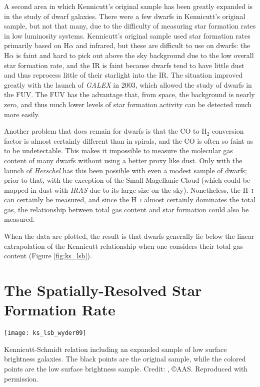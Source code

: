 A second area in which Kennicutt's original sample has been greatly expanded is in the study of dwarf galaxies. There were a few dwarfs in Kennicutt's original sample, but not that many, due to the difficulty of measuring star formation rates in low luminosity systems. Kennicutt's original sample used star formation rates primarily based on H$\alpha$ and infrared, but these are difficult to use on dwarfs: the H$\alpha$ is faint and hard to pick out above the sky background due to the low overall star formation rate, and the IR is faint because dwarfs tend to have little dust and thus reprocess little of their starlight into the IR. The situation improved greatly with the launch of \textit{GALEX} in 2003, which allowed the study of dwarfs in the FUV. The FUV has the advantage that, from space, the background is nearly zero, and thus much lower levels of star formation activity can be detected much more easily.

Another problem that does remain for dwarfs is that the CO to H$_2$ conversion factor is almost certainly different than in spirals, and the CO is often so faint as to be undetectable. This makes it impossible to measure the molecular gas content of many dwarfs without using a better proxy like dust. Only with the launch of \textit{Herschel} has this been possible with even a modest sample of dwarfs; prior to that, with the exception of the Small Magellanic Cloud (which could be mapped in dust with \textit{IRAS} due to its large size on the sky). Nonetheless, the H~\textsc{i} can certainly be measured, and since the H~\textsc{i} almost certainly dominates the total gas, the relationship between total gas content and star formation could also be measured.

When the data are plotted, the result is that dwarfs generally lie below the linear extrapolation of the Kennicutt relationship when one considers their total gas content (Figure \ref{fig:ks_lsb}).

\section{The Spatially-Resolved Star Formation Rate}

\begin{marginfigure}
\texttt{[image: ks\_lsb\_wyder09]}
\caption[Kennicutt-Schmidt relation, with additional low surface brightness sample]{
\label{fig:ks_lsb}
Kennicutt-Schmidt relation including an expanded sample of low surface brightness galaxies. The black points are the original \citet{kennicutt98a} sample, while the colored points are the low surface brightness sample. Credit: \citet{wyder09a}, \copyright AAS. Reproduced with permission.
}
\end{marginfigure}

